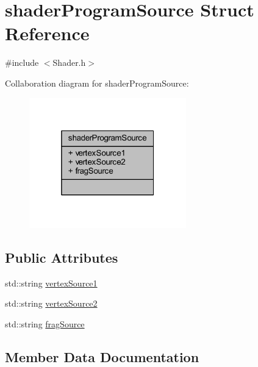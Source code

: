 \hypertarget{structshader_program_source}{}\section{shader\+Program\+Source Struct Reference}
\label{structshader_program_source}


{\ttfamily \#include $<$Shader.\+h$>$}



Collaboration diagram for shader\+Program\+Source\+:
\nopagebreak
\begin{figure}[H]
\begin{center}
\leavevmode
\includegraphics[width=193pt]{structshader_program_source__coll__graph}
\end{center}
\end{figure}
\subsection*{Public Attributes}
\begin{DoxyCompactItemize}
\item 
std\+::string \mbox{\hyperlink{structshader_program_source_a32a8a4f7abe96ffe574ab0f77b070e31}{vertex\+Source1}}
\item 
std\+::string \mbox{\hyperlink{structshader_program_source_ace1d4cf682aaa7b3bf838f48da9ec502}{vertex\+Source2}}
\item 
std\+::string \mbox{\hyperlink{structshader_program_source_ac9333ff8fc08dfff7a5f6cd29bff57be}{frag\+Source}}
\end{DoxyCompactItemize}


\subsection{Member Data Documentation}
\mbox{\label{structshader_program_source_ac9333ff8fc08dfff7a5f6cd29bff57be}} 
